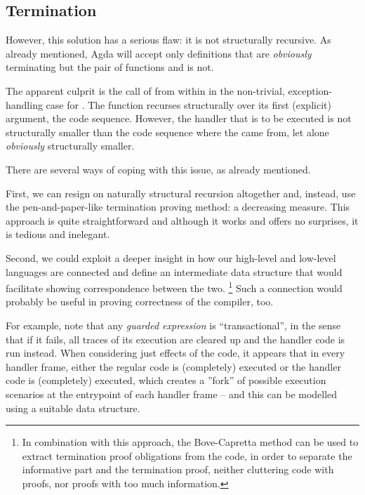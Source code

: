 \subsection{Termination}

However, this solution has a serious flaw: it is not structurally recursive.
As already mentioned, Agda will accept only definitions that are \emph{obviously}
terminating but the pair of functions  and 
is not.

The apparent culprit is the call of  from within
 in the non-trivial, exception-handling case for
. The function  recurses structurally over its
first (explicit) argument, the code sequence. However, the handler that is to
be executed is not structurally smaller than the code sequence where the
 came from, let alone \emph{obviously} structurally smaller.

There are several ways of coping with this issue, as already mentioned.

First, we can resign on naturally structural recursion altogether and, instead,
use the pen-and-paper-like termination proving method: a decreasing measure.
This approach is quite straightforward and although it works and offers no
surprises, it is tedious and inelegant.

Second, we could exploit a deeper insight in how our high-level and low-level
languages are connected and define an intermediate data structure that would
facilitate showing correspondence between the two.%
\footnote{In combination with this approach, the Bove-Capretta method can be used to
extract termination proof obligations from the code, in order to separate the
informative part and the termination proof, neither cluttering code with
proofs, nor proofs with too much information.} Such a connection would probably
be useful in proving correctness of the compiler, too.


For example, note that any \emph{guarded expression} is
``transactional'', in the sense that if it fails, all traces of its execution
are cleared up and the handler code is run instead. When considering just
effects of the code, it appears that in every handler frame, either the regular
code is (completely) executed or the handler code is (completely) executed,
which creates a ''fork'' of possible execution scenarios at the entrypoint of
each handler frame -- and this can be modelled using a suitable data structure.

